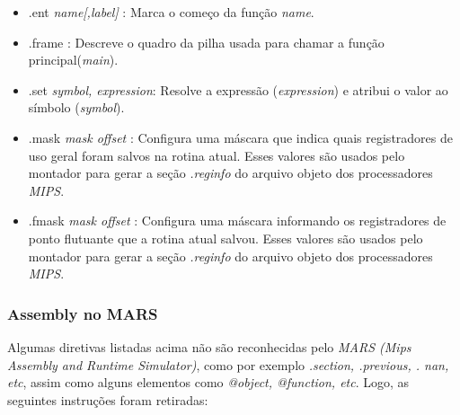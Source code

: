 \documentclass[12pt]{article}
\begin{document}
\begin{itemize}
\item .ent \textit{name[,label]} : Marca o começo da função \textit{name}.
\item .frame : Descreve o quadro da pilha usada para chamar a função principal(\textit{main}).
\item .set \textit{symbol, expression}: Resolve a expressão (\textit{expression}) e atribui o valor ao símbolo (\textit{symbol}).
\item .mask \textit{mask offset} : Configura uma máscara que indica quais registradores de uso geral foram salvos na rotina atual. Esses valores são usados pelo montador para gerar a seção \textit{.reginfo} do arquivo objeto dos processadores \textit{MIPS}.
\item .fmask \textit{mask offset} : Configura uma máscara informando os registradores de ponto flutuante que a rotina atual salvou. Esses valores são usados pelo montador para gerar a seção \textit{.reginfo} do arquivo objeto dos processadores \textit{MIPS}.

\end{itemize}

\subsubsection{Assembly no MARS}
\label{subsubsec:atomars}

Algumas diretivas listadas acima não são reconhecidas pelo \textit{MARS (Mips Assembly and Runtime Simulator)}, como por exemplo \textit{.section, .previous, . nan, etc}, assim como alguns elementos como \textit{@object, @function, etc}. Logo, as seguintes instruções foram retiradas:
\end{document}
